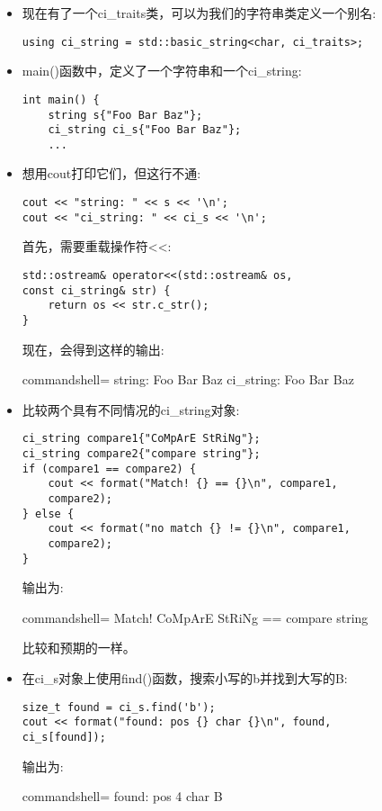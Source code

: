 \begin{itemize}
\item 
现在有了一个ci\_traits类，可以为我们的字符串类定义一个别名:

\begin{lstlisting}[style=styleCXX]
using ci_string = std::basic_string<char, ci_traits>;
\end{lstlisting}

\item 
main()函数中，定义了一个字符串和一个ci\_string:

\begin{lstlisting}[style=styleCXX]
int main() {
	string s{"Foo Bar Baz"};
	ci_string ci_s{"Foo Bar Baz"};
	...
\end{lstlisting}

\item 
想用cout打印它们，但这行不通:

\begin{lstlisting}[style=styleCXX]
cout << "string: " << s << '\n';
cout << "ci_string: " << ci_s << '\n';
\end{lstlisting}

首先，需要重载操作符<{}<:

\begin{lstlisting}[style=styleCXX]
std::ostream& operator<<(std::ostream& os,
const ci_string& str) {
	return os << str.c_str();
}
\end{lstlisting}

现在，会得到这样的输出:

\begin{tcblisting}{commandshell={}}
string: Foo Bar Baz
ci_string: Foo Bar Baz
\end{tcblisting}

\item 
比较两个具有不同情况的ci\_string对象:

\begin{lstlisting}[style=styleCXX]
ci_string compare1{"CoMpArE StRiNg"};
ci_string compare2{"compare string"};
if (compare1 == compare2) {
	cout << format("Match! {} == {}\n", compare1,
	compare2);
} else {
	cout << format("no match {} != {}\n", compare1,
	compare2);
}
\end{lstlisting}

输出为:

\begin{tcblisting}{commandshell={}}
Match! CoMpArE StRiNg == compare string
\end{tcblisting}

比较和预期的一样。

\item 
在ci\_s对象上使用find()函数，搜索小写的b并找到大写的B:

\begin{lstlisting}[style=styleCXX]
size_t found = ci_s.find('b');
cout << format("found: pos {} char {}\n", found,
ci_s[found]);
\end{lstlisting}

输出为:

\begin{tcblisting}{commandshell={}}
found: pos 4 char B
\end{tcblisting}
\end{itemize}

